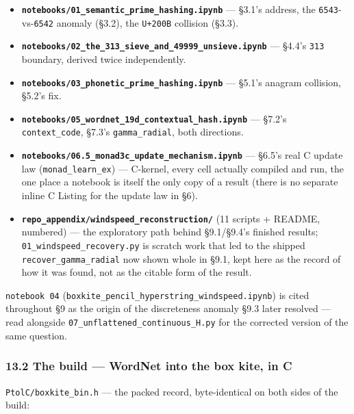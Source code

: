 \documentclass[
  10pt,
]{article}
\providecommand{\tightlist}{%
  \setlength{\itemsep}{0pt}\setlength{\parskip}{0pt}}
\begin{document}
\begin{itemize}
\tightlist
\item
  \textbf{\texttt{notebooks/01\_semantic\_prime\_hashing.ipynb}} ---
  §3.1's address, the \texttt{6543}-vs-\texttt{6542} anomaly (§3.2), the
  \texttt{U+200B} collision (§3.3).
\item
  \textbf{\texttt{notebooks/02\_the\_313\_sieve\_and\_49999\_unsieve.ipynb}}
  --- §4.4's \texttt{313} boundary, derived twice independently.
\item
  \textbf{\texttt{notebooks/03\_phonetic\_prime\_hashing.ipynb}} ---
  §5.1's anagram collision, §5.2's fix.
\item
  \textbf{\texttt{notebooks/05\_wordnet\_19d\_contextual\_hash.ipynb}}
  --- §7.2's \texttt{context\_code}, §7.3's \texttt{gamma\_radial}, both
  directions.
\item
  \textbf{\texttt{notebooks/06.5\_monad3c\_update\_mechanism.ipynb}} ---
  §6.5's real C update law (\texttt{monad\_learn\_ex}) --- C-kernel,
  every cell actually compiled and run, the one place a notebook is
  itself the only copy of a result (there is no separate inline C
  Listing for the update law in §6).
\item
  \textbf{\texttt{repo\_appendix/windspeed\_reconstruction/}} (11
  scripts + README, numbered) --- the exploratory path behind
  §9.1/§9.4's finished results; \texttt{01\_windspeed\_recovery.py} is
  scratch work that led to the shipped \texttt{recover\_gamma\_radial}
  now shown whole in §9.1, kept here as the record of how it was found,
  not as the citable form of the result.
\end{itemize}

\texttt{notebook\ 04}
(\texttt{boxkite\_pencil\_hyperstring\_windspeed.ipynb}) is cited
throughout §9 as the origin of the discreteness anomaly §9.3 later
resolved --- read alongside \texttt{07\_unflattened\_continuous\_H.py}
for the corrected version of the same question.

\hypertarget{the-build-wordnet-into-the-box-kite-in-c}{%
\subsubsection{13.2 The build --- WordNet into the box kite, in
C}\label{the-build-wordnet-into-the-box-kite-in-c}}

\texttt{PtolC/boxkite\_bin.h} --- the packed record, byte-identical on
both sides of the build:
\end{document}
